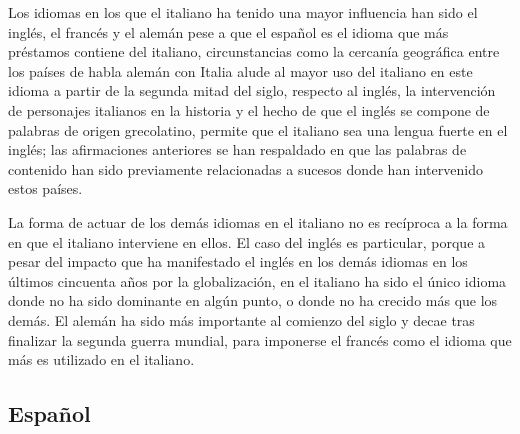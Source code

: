 Los idiomas en los que el italiano ha tenido una mayor influencia han sido el inglés, el francés y el alemán pese a que el español es el idioma que más préstamos contiene del  italiano,  circunstancias como la cercanía geográfica entre los países de habla alemán con Italia alude al  mayor uso del italiano en este idioma a partir de  la segunda mitad del siglo,  respecto al inglés,  la intervención de personajes  italianos en la historia y el hecho de que el inglés se compone de palabras de origen grecolatino,  permite que el italiano sea una lengua fuerte en el inglés;  las afirmaciones anteriores se han respaldado en que las palabras de contenido han sido previamente relacionadas  a sucesos donde han intervenido estos países.


La forma de actuar de los demás idiomas en el italiano no es recíproca a la forma en que el italiano interviene en ellos.  El caso del inglés es particular, porque a pesar del impacto que ha manifestado el inglés en los demás idiomas  en los últimos cincuenta años por la globalización,  en el italiano ha sido el único idioma donde no ha sido dominante en algún punto, o donde no ha crecido más que los demás.  El alemán ha sido más importante al comienzo del siglo y decae tras finalizar la segunda guerra mundial, para imponerse el francés como el idioma que más es utilizado en el italiano. 


\newpage
\subsection{Español}


